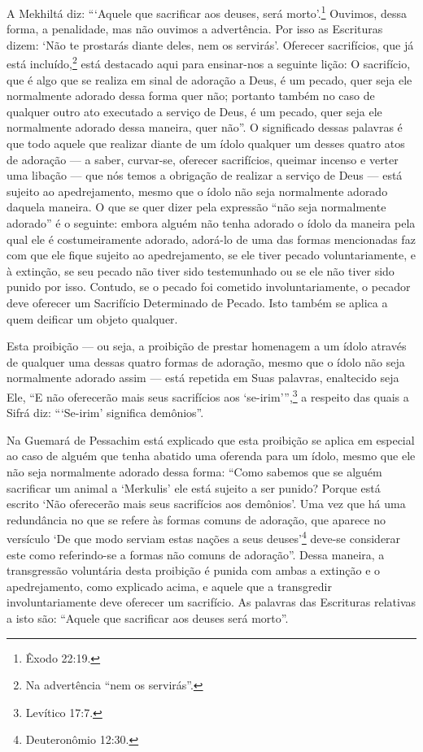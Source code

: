 A Mekhiltá diz: ```Aquele que sacrificar aos deuses, será morto'.\footnote{Êxodo
22:19.} Ouvimos, dessa forma, a penalidade, mas não ouvimos a
advertência. Por isso as Escrituras dizem: `Não te prostarás diante
deles, nem os servirás'.
Oferecer sacrifícios, que já está incluído,\footnote{Na advertência ``nem os servirás''.} está
destacado aqui para ensinar-nos a seguinte lição: O sacrifício, que é
algo que se realiza em sinal de adoração a Deus, é um pecado, quer seja
ele normalmente adorado dessa forma quer não; portanto também no caso de
qualquer outro ato executado a serviço de Deus, é um pecado, quer seja
ele normalmente adorado dessa maneira, quer não''. O significado dessas
palavras é que todo aquele que realizar diante de um ídolo qualquer um
desses quatro atos de adoração --- a saber, curvar-se, oferecer
sacrifícios, queimar incenso e verter uma libação --- que nós temos a
obrigação de realizar a serviço de Deus --- está sujeito ao
apedrejamento, mesmo que o ídolo não seja normalmente adorado daquela
maneira. O que se quer dizer pela expressão ``não seja normalmente
adorado'' é o seguinte: embora alguém não tenha adorado o ídolo da
maneira pela qual ele é costumeiramente adorado, adorá-lo de uma das
formas mencionadas faz com que ele fique sujeito ao apedrejamento, se
ele tiver pecado voluntariamente, e à extinção, se seu pecado não tiver
sido testemunhado ou se ele não tiver sido punido por isso. Contudo, se
o pecado foi cometido involuntariamente, o pecador deve oferecer um
Sacrifício Determinado de Pecado. Isto também se aplica a quem deificar
um objeto qualquer.

Esta proibição --- ou seja, a proibição de prestar homenagem a um ídolo
através de qualquer uma dessas quatro formas de adoração, mesmo que o
ídolo não seja normalmente adorado assim --- está repetida em Suas
palavras, enaltecido seja Ele, ``E não oferecerão mais seus sacrifícios
aos `se-irim''',\footnote{Levítico 17:7.} a respeito das quais a Sifrá diz:
```Se-irim' significa demônios''.

Na Guemará de Pessachim está explicado que esta proibição se aplica em
especial ao caso de alguém que tenha abatido uma oferenda para um ídolo,
mesmo que ele não seja normalmente adorado dessa forma: ``Como sabemos
que se alguém sacrificar um animal a `Merkulis' ele está sujeito a ser
punido? Porque está escrito `Não oferecerão mais seus sacrifícios aos
demônios'. Uma vez que há uma redundância no que se refere às formas
comuns de adoração, que aparece no versículo `De que modo serviam estas
nações a seus deuses'\footnote{Deuteronômio 12:30.} deve-se considerar este como
referindo-se a formas não comuns de adoração''. Dessa maneira, a
transgressão voluntária desta proibição é punida com ambas a extinção e
o apedrejamento, como explicado acima, e aquele que a transgredir
involuntariamente deve oferecer um sacrifício. As palavras das
Escrituras relativas a isto são: ``Aquele que sacrificar aos deuses será
morto''.

